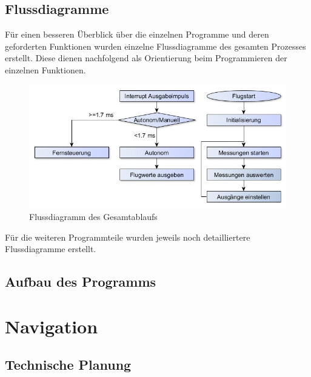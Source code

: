 
  \subsection{Flussdiagramme}
  Für einen besseren Überblick über die einzelnen Programme und deren geforderten Funktionen wurden einzelne Flussdiagramme des gesamten Prozesses erstellt.
  Diese dienen nachfolgend als Orientierung beim Programmieren der einzelnen Funktionen.

  \begin{figure}[tbh]
    \begin{centering}
      \includegraphics[width = \textwidth]{Bilder/Flussdiagramm}
    \par\end{centering}
    \caption{Flussdiagramm des Gesamtablaufs}
    \label{Flussdiragramm}
  \end{figure}

  Für die weiteren Programmteile wurden jeweils noch detailliertere Flussdiagramme erstellt.

  \subsection{Aufbau des Programms}


\section{Navigation}

  \subsection{Technische Planung}

